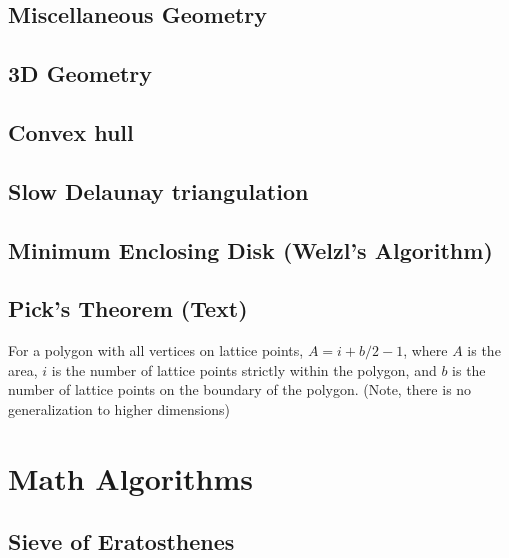 \documentclass[9pt]{extarticle}
\begin{document}
\begin{multicols*}{3}
\subsection{Miscellaneous Geometry} %


\subsection{3D Geometry}


\subsection{Convex hull} %


\subsection{Slow Delaunay triangulation} %


\subsection{Minimum Enclosing Disk (Welzl's Algorithm)} %


\subsection{Pick's Theorem (Text)} %
For a polygon with all vertices on lattice points, $A = i + b/2 - 1$, where $A$
is the area, $i$ is the number of lattice points strictly within the polygon,
and $b$ is the number of lattice points on the boundary of the polygon. (Note,
there is no generalization to higher dimensions)

\section{Math Algorithms}

\subsection{Sieve of Eratosthenes} %



\end{multicols*}
\end{document}
